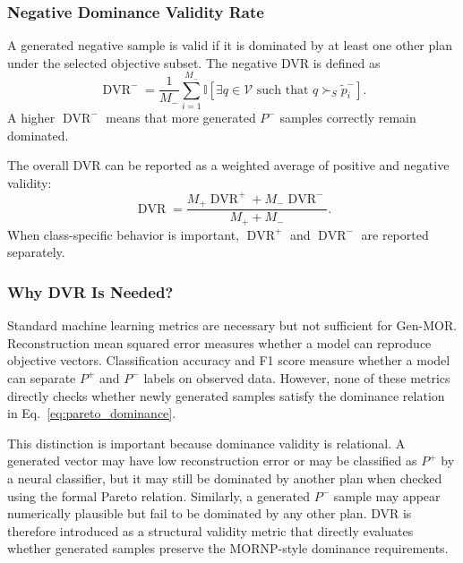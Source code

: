 \subsubsection{Negative Dominance Validity Rate}
\label{subsubsec:negative_dvr}

A generated negative sample is valid if it is dominated by at least one other plan under the selected objective subset. The negative DVR is defined as
\begin{equation}
    \operatorname{DVR}^{-}
    =
    \frac{1}{M_{-}}
    \sum_{i=1}^{M_{-}}
    \mathbb{I}
    \left[
    \exists q \in \mathcal{V}
    \text{ such that }
    q \succ_S \tilde{p}^{-}_i
    \right].
    \label{eq:negative_dvr}
\end{equation}
A higher $\operatorname{DVR}^{-}$ means that more generated $P^{-}$ samples correctly remain dominated.

The overall DVR can be reported as a weighted average of positive and negative validity:
\begin{equation}
    \operatorname{DVR}
    =
    \frac{
        M_{+}\operatorname{DVR}^{+}
        +
        M_{-}\operatorname{DVR}^{-}
    }{
        M_{+}+M_{-}
    }.
    \label{eq:overall_dvr}
\end{equation}
When class-specific behavior is important, $\operatorname{DVR}^{+}$ and $\operatorname{DVR}^{-}$ are reported separately.

\subsubsection{Why DVR Is Needed?}
\label{subsubsec:why_dvr_needed}

Standard machine learning metrics are necessary but not sufficient for Gen-MOR. Reconstruction mean squared error measures whether a model can reproduce objective vectors. Classification accuracy and F1 score measure whether a model can separate $P^{+}$ and $P^{-}$ labels on observed data. However, none of these metrics directly checks whether newly generated samples satisfy the dominance relation in Eq.~\eqref{eq:pareto_dominance}.

This distinction is important because dominance validity is relational. A generated vector may have low reconstruction error or may be classified as $P^{+}$ by a neural classifier, but it may still be dominated by another plan when checked using the formal Pareto relation. Similarly, a generated $P^{-}$ sample may appear numerically plausible but fail to be dominated by any other plan. DVR is therefore introduced as a structural validity metric that directly evaluates whether generated samples preserve the MORNP-style dominance requirements.